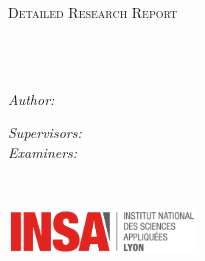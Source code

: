 \documentclass[
11pt, %
english, %
singlespacing, %
headsepline, %
]{MastersDoctoralThesis} %
\author{Benoit \textsc{Renault}} %
\begin{document}
\frontmatter %

\pagestyle{plain} %


\begin{titlepage}
\begin{center}

\vspace*{.06\textheight}
{\scshape\LARGE \univname\par}\vspace{1.5cm} %
\textsc{\Large Detailed Research Report}\\[0.5cm] %

\HRule \\[0.4cm] %
{\huge \bfseries \ttitle\par}\vspace{0.4cm} %
\HRule \\[1.5cm] %

\begin{minipage}[t]{0.4\textwidth}
\begin{flushleft} \large
\emph{Author:}\\
\href{http://littleroot.net/}{\authorname} %
\end{flushleft}
\end{minipage}
\begin{minipage}[t]{0.4\textwidth}
\begin{flushright} \large
\emph{Supervisors:} \\
\supname %
\medskip
\emph{Examiners:} \\
\examname %
\end{flushright}
\end{minipage}\\[3cm]

\medskip

\vspace{0.35cm}
\includegraphics[width=5cm]{insa_color.png} %
\vspace{0.35cm}


\end{center}
\end{titlepage}
\end{document}
